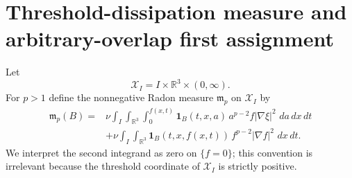 \documentclass[11pt]{article}
\theoremstyle{definition}\newtheorem{definition}[theorem]{Definition}
\theoremstyle{remark}\newtheorem{remark}[theorem]{Remark}
\newcommand{\R}{\mathbb R}\newcommand{\dd}{\,d}\newcommand{\HH}{\mathcal H}
\begin{document}
\section{Threshold-dissipation measure and arbitrary-overlap first assignment}
Let
\[
\mathcal X_I=I\times\R^3\times(0,\infty).
\]
For $p>1$ define the nonnegative Radon measure $\mathfrak m_p$ on
$\mathcal X_I$ by
\[
\begin{aligned}
\mathfrak m_p(B)={}&
\nu\int_I\int_{\R^3}\int_0^{f(x,t)}
\mathbf 1_B(t,x,a)\,a^{p-2}f|\nabla\xi|^2\,\dd a\dd x\dd t\\
&+\nu\int_I\int_{\R^3}
\mathbf 1_B(t,x,f(x,t))\,f^{p-2}|\nabla f|^2\,\dd x\dd t.
\end{aligned}
\]
We interpret the second integrand as zero on $\{f=0\}$; this convention is
irrelevant because the threshold coordinate of $\mathcal X_I$ is strictly
positive.
\end{document}
